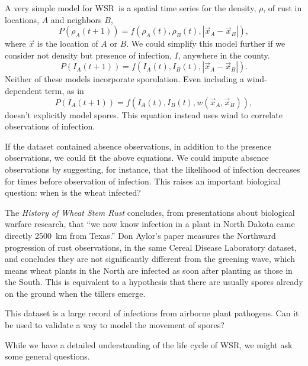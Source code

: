 \documentclass{article}
\newcommand{\wsr}{\textsc{WSR}}
\begin{document}
A very simple model for \wsr\ is a spatial time series for the density, $\rho$, of rust in locations, $A$ and neighbors $B$,
\begin{equation}
	P(\rho_A(t+1))=f(\rho_A(t), \rho_B(t), |\vec{x}_A-\vec{x}_B|),
\end{equation}
where $\vec{x}$ is the location of $A$ or $B$.
We could simplify this model further if we consider not density but presence of infection, $I$, anywhere in the county.
\begin{equation}
	P(I_A(t+1))=f(I_A(t), I_B(t), |\vec{x}_A-\vec{x}_B|).
\end{equation}
Neither of these models incorporate sporulation. Even including a wind-dependent term, as in
\begin{equation}
	P(I_A(t+1))=f(I_A(t), I_B(t), w(\vec{x}_A,\vec{x}_B)),
\end{equation}
doesn't explicitly model spores. This equation instead uses wind to correlate observations of infection.

If the dataset contained absence observations, in addition to the presence observations, we could fit the above equations. We could impute absence observations by suggesting, for instance, that the likelihood of infection decreases for times before observation of infection. This raises an important biological question: when is the wheat infected?

The \textit{History of Wheat Stem Rust} concludes, from presentations about biological warfare research, that ``we now know infection in a plant in North Dakota came directly 2500~km from Texas.'' Don Aylor's paper measures the Northward progression of rust observations, in the same Cereal Disease Laboratory dataset, and concludes they are not significantly different from the greening wave, which means wheat plants in the North are infected as soon after planting as those in the South. This is equivalent to a hypothesis that there are usually spores already on the ground when the tillers emerge.

This dataset is a large record of infections from airborne plant pathogens. Can it be used to validate a way to model the movement of spores?

While we have a detailed understanding of the life cycle of \wsr, we might ask some general questions.
\end{document}
